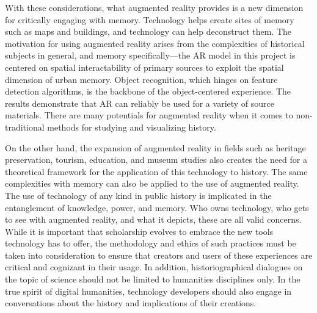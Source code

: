 With these considerations, what augmented reality provides is a new dimension for critically engaging with memory. Technology helps create sites of memory such as maps and buildings, and technology can help deconstruct them. The motivation for using augmented reality arises from the complexities of historical subjects in general, and memory specifically---the AR model in this project is centered on spatial interactability of primary sources to exploit the spatial dimension of urban memory. Object recognition, which hinges on feature detection algorithms, is the backbone of the object-centered experience. The results demonstrate that AR can reliably be used for a variety of source materials. There are many potentials for augmented reality when it comes to non-traditional methods for studying and visualizing history. %

On the other hand, the expansion of augmented reality in fields such as heritage preservation, tourism, education, and museum studies also creates the need for a theoretical framework for the application of this technology to history. The same complexities with memory can also be applied to the use of augmented reality. The use of technology of any kind in public history is implicated in the entanglement of knowledge, power, and memory. Who owns technology, who gets to see with augmented reality, and what it depicts, these are all valid concerns. While it is important that scholarship evolves to embrace the new tools technology has to offer, the methodology and ethics of such practices must be taken into consideration to ensure that creators and users of these experiences are critical and cognizant in their usage. In addition, historiographical dialogues on the topic of science should not be limited to humanities disciplines only. In the true spirit of digital humanities, technology developers should also engage in conversations about the history and implications of their creations.